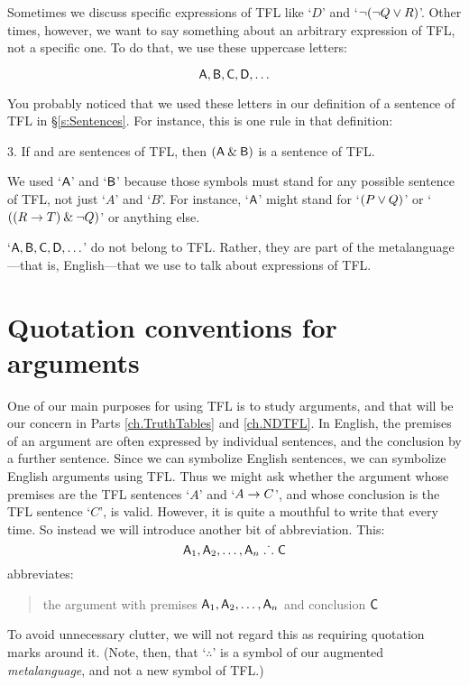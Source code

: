 Sometimes we discuss specific expressions of TFL like `$D$' and `${\neg} ({\neg} Q \vee R)$'. Other times, however, we want to say something about an arbitrary expression of TFL, not a specific one. To do that, we use these uppercase letters:
	
	$$\mathsf{A}, \mathsf{B}, \mathsf{C}, \mathsf{D}, \ldots$$
	
You probably noticed that we used these letters in our definition of a sentence of TFL in \S\ref{s:Sentences}. For instance, this is one rule in that definition:

\begin{earg}
\item[3.] If  and  are sentences of TFL, then $(\mathsf{A}\mathbin{\&}\mathsf{B})$ is a sentence of TFL.
\end{earg}

We used `$\mathsf{A}$' and `$\mathsf{B}$' because those symbols must stand for any possible sentence of TFL, not just `$A$' and `$B$'. For instance, `$\mathsf{A}$' might stand 
for `$(P \vee Q)$' or `$((R \rightarrow T) \mathbin{\&} {\neg} Q)$' or anything else.

`$\mathsf{A}, \mathsf{B}, \mathsf{C}, \mathsf{D}, \ldots$' do not belong to TFL. Rather, they are part of the metalanguage---that is, English---that we use to talk about expressions of TFL. 
	


\section{Quotation conventions for arguments}

One of our main purposes for using TFL is to study arguments, and that will be our concern in Parts \ref{ch.TruthTables} and \ref{ch.NDTFL}. In English, the premises of an argument are often expressed by individual sentences, and the conclusion by a further sentence. Since we can symbolize English sentences, we can symbolize English arguments using TFL. Thus we might ask whether the argument whose premises are the TFL sentences `$A$' and `$A \rightarrow C$', and whose conclusion is the TFL sentence `$C$', is valid. However, it is quite a mouthful to write that every time. So instead we will introduce another bit of abbreviation. This:
	$$\mathsf{A}_1, \mathsf{A}_2, \ldots, \mathsf{A}_n \mathrel{\ldotp\dot{}\,\ldotp} \mathsf{C}$$
abbreviates:
	\begin{quote}
		the argument with premises $\mathsf{A}_1, \mathsf{A}_2, \ldots, \mathsf{A}_n$ and conclusion $\mathsf{C}$
	\end{quote}
To avoid unnecessary clutter, we will not regard this as requiring quotation marks around it. (Note, then, that `$\therefore$' is a symbol of our augmented \emph{metalanguage}, and not a new symbol of TFL.)
